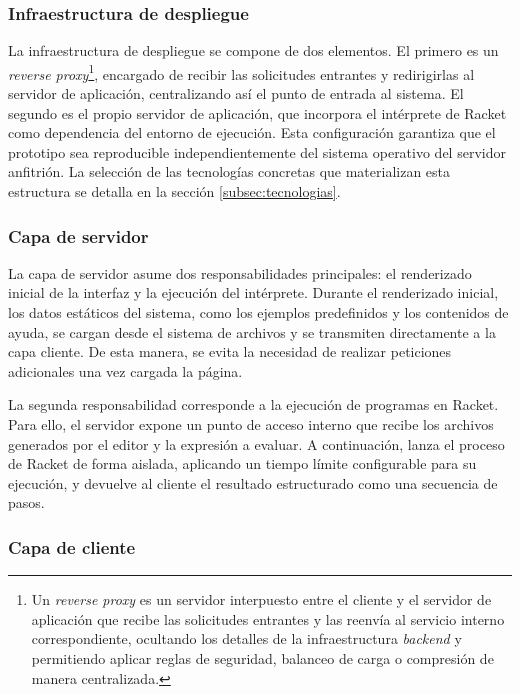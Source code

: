 \subsubsection{Infraestructura de despliegue}

La infraestructura de despliegue se compone de dos elementos. El primero es un \textit{reverse proxy}\footnote{Un \textit{reverse proxy} es un servidor interpuesto entre el cliente y el servidor de aplicación que recibe las solicitudes entrantes y las reenvía al servicio interno correspondiente, ocultando los detalles de la infraestructura \textit{backend} y permitiendo aplicar reglas de seguridad, balanceo de carga o compresión de manera centralizada.}, encargado de recibir las solicitudes entrantes y redirigirlas al servidor de aplicación, centralizando así el punto de entrada al sistema. El segundo es el propio servidor de aplicación, que incorpora el intérprete de Racket como dependencia del entorno de ejecución. Esta configuración garantiza que el prototipo sea reproducible independientemente del sistema operativo del servidor anfitrión. La selección de las tecnologías concretas que materializan esta estructura se detalla en la sección \ref{subsec:tecnologias}.

\subsubsection{Capa de servidor}

La capa de servidor asume dos responsabilidades principales: el renderizado inicial de la interfaz y la ejecución del intérprete. Durante el renderizado inicial, los datos estáticos del sistema, como los ejemplos predefinidos y los contenidos de ayuda, se cargan desde el sistema de archivos y se transmiten directamente a la capa cliente. De esta manera, se evita la necesidad de realizar peticiones adicionales una vez cargada la página.

La segunda responsabilidad corresponde a la ejecución de programas en Racket. Para ello, el servidor expone un punto de acceso interno que recibe los archivos generados por el editor y la expresión a evaluar. A continuación, lanza el proceso de Racket de forma aislada, aplicando un tiempo límite configurable para su ejecución, y devuelve al cliente el resultado estructurado como una secuencia de pasos.

\subsubsection{Capa de cliente}

